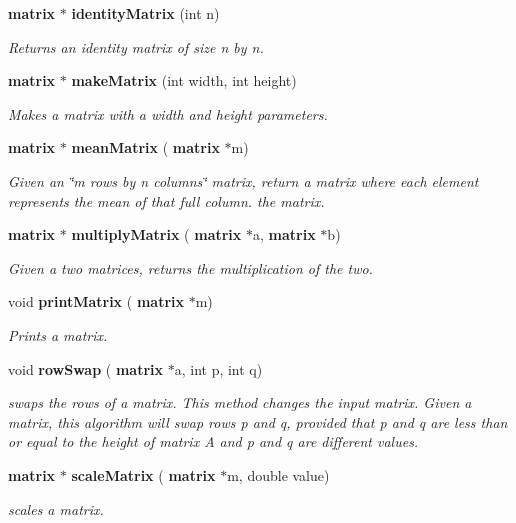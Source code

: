 \begin{DoxyCompactItemize}
\textbf{ matrix} $\ast$ \textbf{ identity\+Matrix} (int n)
\begin{DoxyCompactList}\small\item\em Returns an identity matrix of size n by n. \end{DoxyCompactList}\item 
\textbf{ matrix} $\ast$ \textbf{ make\+Matrix} (int width, int height)
\begin{DoxyCompactList}\small\item\em Makes a matrix with a width and height parameters. \end{DoxyCompactList}\item 
\textbf{ matrix} $\ast$ \textbf{ mean\+Matrix} (\textbf{ matrix} $\ast$m)
\begin{DoxyCompactList}\small\item\em Given an \char`\"{}m rows by n columns\char`\"{} matrix, return a matrix where each element represents the mean of that full column.  the matrix. \end{DoxyCompactList}\item 
\textbf{ matrix} $\ast$ \textbf{ multiply\+Matrix} (\textbf{ matrix} $\ast$a, \textbf{ matrix} $\ast$b)
\begin{DoxyCompactList}\small\item\em Given a two matrices, returns the multiplication of the two. \end{DoxyCompactList}\item 
void \textbf{ print\+Matrix} (\textbf{ matrix} $\ast$m)
\begin{DoxyCompactList}\small\item\em Prints a matrix. \end{DoxyCompactList}\item 
void \textbf{ row\+Swap} (\textbf{ matrix} $\ast$a, int p, int q)
\begin{DoxyCompactList}\small\item\em swaps the rows of a matrix. This method changes the input matrix. Given a matrix, this algorithm will swap rows p and q, provided that p and q are less than or equal to the height of matrix A and p and q are different values. \end{DoxyCompactList}\item 
\textbf{ matrix} $\ast$ \textbf{ scale\+Matrix} (\textbf{ matrix} $\ast$m, double value)
\begin{DoxyCompactList}\small\item\em scales a matrix. \end{DoxyCompactList}\item 

\end{DoxyCompactItemize}
